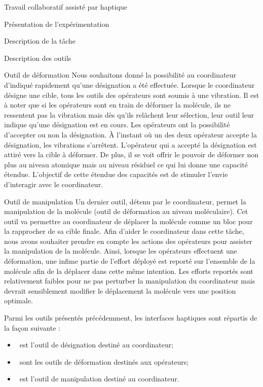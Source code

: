 \documentclass[myfrancais,ngerman,english,frenchb]{mythesis}
\begin{document}
\begin{mychapter}{Travail collaboratif assisté par haptique}
\begin{mysection}{Présentation de l'expérimentation}
\begin{mysubsection}{Description de la tâche}
\begin{mysubsubsection}{Description des outils}
\begin{myparagraph}{Outil de déformation}
						Nous souhaitons donné la possibilité au coordinateur d'indiqué rapidement qu'une désignation a été effectuée.
						Lorsque le coordinateur désigne une cible, tous les outils des opérateurs sont soumis à une vibration.
						Il est à noter que si les opérateurs sont en train de déformer la molécule, ils ne ressentent pas la vibration mais dès qu'ils relâchent leur sélection, leur outil leur indique qu'une désignation est en cours.
						Les opérateurs ont la possibilité d'accepter ou non la désignation.
						À l'instant où un des deux opérateur accepte la désignation, les vibrations s'arrêtent.
						L'opérateur qui a accepté la désignation est attiré vers la cible à déformer.
						De plus, il se voit offrir le pouvoir de déformer non plus au niveau atomique mais au niveau résiduel ce qui lui donne une capacité étendue.
						L'objectif de cette étendue des capacités est de stimuler l'envie d'interagir avec le coordinateur.
					\end{myparagraph}
					\begin{myparagraph}{Outil de manipulation}
						Un dernier outil, détenu par le coordinateur, permet la manipulation de la molécule (outil de déformation au niveau moléculaire).
						Cet outil va permettre au coordinateur de déplacer la molécule comme un bloc pour la rapprocher de sa cible finale.
						Afin d'aider le coordinateur dans cette tâche, nous avons souhaiter prendre en compte les actions des opérateurs pour assister la manipulation de la molécule.
						Ainsi, lorsque les opérateurs effectuent une déformation, une infime partie de l'effort déployé est reporté sur l'ensemble de la molécule afin de la déplacer dans cette même intention.
						Les efforts reportés sont relativement faibles pour ne pas perturber la manipulation du coordinateur mais devrait sensiblement modifier le déplacement la molécule vers une position optimale.
					\end{myparagraph}

					Parmi les outils présentés précédemment, les interfaces haptiques sont répartis de la façon suivante :
					\begin{itemize}
						\item {}~\myOmni est l'outil de désignation destiné au coordinateur;
						\item {}~\myOmni sont les outils de déformation destinés aux opérateurs;
						\item {}~\myDesktop est l'outil de manipulation destiné au coordinateur.
					\end{itemize}


\end{mysubsubsection}
\end{mysubsection}
\end{mysection}
\end{mychapter}
\end{document}
